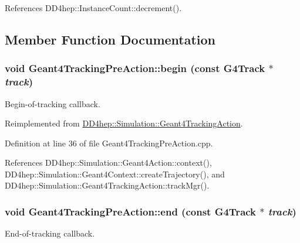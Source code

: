 References DD4hep::InstanceCount::decrement().

\subsection{Member Function Documentation}
\hypertarget{class_d_d4hep_1_1_simulation_1_1_geant4_tracking_pre_action_a1a4535994e5225ef10c47164a21deb92}{
\subsubsection[{begin}]{\setlength{\rightskip}{0pt plus 5cm}void Geant4TrackingPreAction::begin (const G4Track $\ast$ {\em track})}}
\label{class_d_d4hep_1_1_simulation_1_1_geant4_tracking_pre_action_a1a4535994e5225ef10c47164a21deb92}


Begin-\/of-\/tracking callback. 

Reimplemented from \hyperlink{class_d_d4hep_1_1_simulation_1_1_geant4_tracking_action_a65858867a7b71bf4f48b9f140bc9a88d}{DD4hep::Simulation::Geant4TrackingAction}.

Definition at line 36 of file Geant4TrackingPreAction.cpp.

References DD4hep::Simulation::Geant4Action::context(), DD4hep::Simulation::Geant4Context::createTrajectory(), and DD4hep::Simulation::Geant4TrackingAction::trackMgr().\hypertarget{class_d_d4hep_1_1_simulation_1_1_geant4_tracking_pre_action_a372b3efd2f2ac8f2c75bb435fd286ac3}{
\subsubsection[{end}]{\setlength{\rightskip}{0pt plus 5cm}void Geant4TrackingPreAction::end (const G4Track $\ast$ {\em track})}}
\label{class_d_d4hep_1_1_simulation_1_1_geant4_tracking_pre_action_a372b3efd2f2ac8f2c75bb435fd286ac3}


End-\/of-\/tracking callback. 

